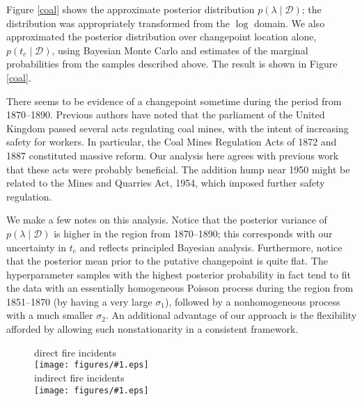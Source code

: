 \documentclass{article}
\newcommand{\psff}[1]{\texttt{[image: figures/\#1.eps]}}
\newcommand{\cm}[1]{\mathcal{#1}}
\newcommand{\data}{\cm{D}}
\newcommand{\given}{\mid}
\begin{document}
Figure \ref{coal} shows the approximate posterior
distribution $p(\lambda \given \data)$; the distribution was
appropriately transformed from the $\log$ domain.  We also
approximated the posterior distribution over changepoint location
alone, $p(t_c \given \data)$, using Bayesian Monte Carlo and estimates
of the marginal probabilities from the samples described above.  The
result is shown in Figure \ref{coal}.

There seems to be evidence of a changepoint sometime during the period
from 1870--1890.  Previous authors have noted that the parliament of
the United Kingdom passed several acts regulating coal mines, with the
intent of increasing safety for workers.  In particular, the Coal
Mines Regulation Acts of 1872 and 1887 constituted massive reform.
Our analysis here agrees with previous work that these acts were
probably beneficial.  The addition hump near 1950 might be related to
the Mines and Quarries Act, 1954, which imposed further safety
regulation.

We make a few notes on this analysis.  Notice that the posterior
variance of $p(\lambda \given \data)$ is higher in the region from
1870--1890; this corresponds with our uncertainty in $t_c$ and reflects
principled Bayesian analysis.  Furthermore, notice that the posterior
mean prior to the putative changepoint is quite flat.  The
hyperparameter samples with the highest posterior probability in fact
tend to fit the data with an essentially homogeneous Poisson process
during the region from 1851--1870 (by having a very large $\sigma_1$),
followed by a nonhomogeneous process with a much smaller $\sigma_2$.
An additional advantage of our approach is the flexibility afforded by
allowing such nonstationarity in a consistent framework.

\begin{figure}
  \centering
  \hspace*{1em} direct fire incidents 
  \vspace*{1ex} \\
  \psff{direct} \\
  \vspace*{2ex}
  \hspace*{1em} indirect fire incidents
  \vspace*{1ex} \\
  \psff{indirect} \\
\end{figure}


\end{document}
